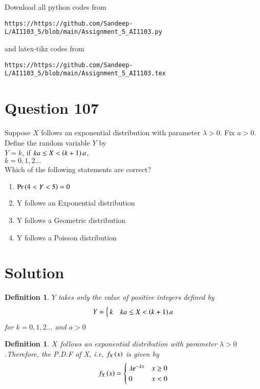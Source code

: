 \documentclass[journal,12pt,twocolumn]{IEEEtran}
\begin{document}
Download all python codes from 
\begin{lstlisting}
https://https://github.com/Sandeep-L/AI1103_5/blob/main/Assignment_5_AI1103.py
\end{lstlisting}
%
and latex-tikz codes from 
%
\begin{lstlisting}
https://https://github.com/Sandeep-L/AI1103_5/blob/main/Assignment_5_AI1103.tex
\end{lstlisting}

\section*{Question 107}
Suppose $X$ follows an exponential distribution with parameter $\lambda>0$. Fix $a>0$. Define the random variable $Y$ by\\
$Y=k$, \qquad if $ka \leq X < \left(k+1\right)a$,\\
$k=0,1,2\ldots$\\
Which of the following statements are correct?
\begin{enumerate}
\setlength\itemsep{0.5em}
    \item $\Pr\left(4<Y<5\right)=0$
    \item Y follows an Exponential distribution
    \item Y follows a Geometric distribution
    \item Y follows a Poisson distribution
\end{enumerate}

\section*{Solution}

\newtheorem*{def_Y}{Definition}

\begin{def_Y}
$Y$ takes only the value of positive integers defined by
\begin{align}
    \label{eq:1}
    Y=
        \begin{cases}
            k & ka \leq X < \left(k+1\right)a
        \end{cases}
    \end{align}
    for $k=0,1,2\ldots$ and $a>0$
\end{def_Y}

\newtheorem*{def_X}{Definition}

\begin{def_X}
    $X$ follows an exponential distribution with parameter $\lambda>0$.Therefore, the P.D.F of X, i.e, $f_X\left(x\right)$ is given by
    \begin{align}
    f_X\left(x\right) =
        \begin{cases}
        \lambda e^{-\lambda x} & x\geq 0 \\
        0 & x<0
        \end{cases}
    \end{align}
\end{def_X}
\end{document}
